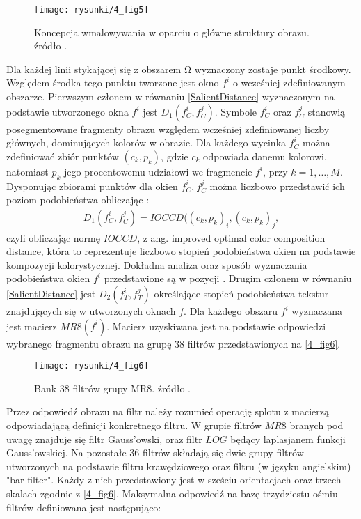 \documentclass[a4paper,12pt,twoside,openany]{report}
\begin{document}
\begin{figure}[!h]
	\centering
	\texttt{[image: rysunki/4\_fig5]}
	\caption{Koncepcja wmalowywania w oparciu o główne struktury obrazu. źródło \cite{StructurePropagationManual}.}
	\label{4_fig5} 
\end{figure}
Dla każdej linii stykającej się z obszarem $\mathrm{\Omega }$ wyznaczony zostaje punkt środkowy. Względem środka tego punktu tworzone jest okno  $f^i$ o wcześniej zdefiniowanym obszarze. Pierwszym członem w równaniu \eqref{SalientDistance} wyznaczonym na podstawie utworzonego okna $f^i$ jest $D_1\left(f^i_C,f^j_C\right)$. Symbole $f^i_C$ oraz $f^j_C$ stanowią posegmentowane fragmenty obrazu względem wcześniej zdefiniowanej liczby głównych, dominujących kolorów w obrazie. Dla każdego wycinka $f^i_C$ można zdefiniować zbiór punktów $(c_k,p_k)$, gdzie $c_k$ odpowiada danemu kolorowi, natomiast $p_k$ jego procentowemu udziałowi we fragmencie $f^i$, przy $k=1,\dots ,M$. Dysponując zbiorami punktów dla okien $f^i_C$,$\ f^j_C$ można liczbowo przedstawić ich poziom podobieństwa obliczając \cite{chen2005adaptive}:
\begin{align}
D_1\left(f^i_C,f^j_C\right)=IOCCD({\left(c_k,p_k\right)}_i,{\left(c_k,p_k\right)}_j,
\label{colDistance}
\end{align}
czyli obliczając normę $IOCCD$, z ang. improved optimal color composition distance, która to reprezentuje liczbowo stopień podobieństwa okien na podstawie kompozycji kolorystycznej.
Dokładna analiza oraz sposób wyznaczania podobieństwa okien $f^i$ przedstawione są w pozycji \cite{chen2005adaptive}.
Drugim członem w równaniu \eqref{SalientDistance} jest $D_2\left(f^i_T,f^j_T\right)$ określające stopień podobieństwa tekstur znajdujących się w utworzonych oknach $f$. Dla każdego obszaru $f^i$ wyznaczana jest macierz $MR8(f^i)$. Macierz uzyskiwana jest na podstawie odpowiedzi wybranego fragmentu obrazu na grupę 38 filtrów przedstawionych na \autoref{4_fig6}.
\begin{figure}[!h]
	\centering
	\texttt{[image: rysunki/4\_fig6]}
	\caption{Bank 38 filtrów grupy MR8. źródło \cite{varma2009statistical}.}
\label{4_fig6}
\end{figure}
Przez odpowiedź obrazu na filtr należy rozumieć operację splotu z macierzą odpowiadającą definicji konkretnego filtru. W grupie filtrów $MR8$ branych pod uwagę znajduje się filtr Gauss'owski, oraz filtr $LOG$ będący laplasjanem funkcji Gauss'owskiej.
Na pozostałe 36 filtrów składają się dwie grupy filtrów utworzonych na podstawie filtru krawędziowego oraz filtru (w języku angielskim) "bar filter". Każdy z nich przedstawiony jest w sześciu orientacjach oraz trzech skalach zgodnie z \autoref{4_fig6}. Maksymalna odpowiedź na bazę trzydziestu ośmiu filtrów definiowana jest następująco:
\end{document}
